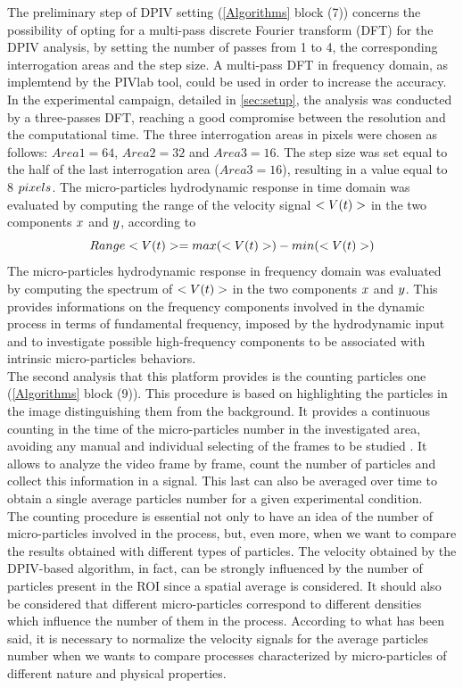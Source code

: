 \documentclass[journal]{IEEEtran}
\theoremstyle{definition}
\theoremstyle{remark}
\begin{document}
The preliminary step of DPIV setting (\fig\ref{Algorithms} block (7)) concerns the possibility of opting for a multi-pass discrete Fourier transform (DFT) for the DPIV analysis, by setting the number of passes from 1 to 4, the corresponding interrogation areas and the step size.
A multi-pass DFT in frequency domain, as implemtend by the PIVlab tool, could be used in order to increase the accuracy. In the experimental campaign, detailed in \sect\ref{sec:setup}, the analysis was conducted by a three-passes DFT, reaching a good compromise between the resolution and the computational time. The three interrogation areas in pixels were chosen as follows: $Area1=64$, $Area2=32$ and $Area3=16$. The step size was set equal to the half of the last interrogation area ($Area3=16$), resulting in a value equal to 8 $pixels$.
The micro-particles hydrodynamic response in time domain was evaluated by computing the range of the velocity signal $<V(t)>$ in the two components $x$ and $y$, according to 
\begin{equation}
	\label{eqn:range}
	Range\meann=max(\meann)-min(\meann)
\end{equation}
The micro-particles hydrodynamic response in frequency domain was evaluated by computing the spectrum of $<V(t)>$ in the two components $x$ and $y$. This provides informations on the frequency components involved in the dynamic process in terms of fundamental frequency, imposed by the hydrodynamic input and to investigate possible high-frequency components to be associated with intrinsic micro-particles behaviors.
\\The second analysis that this platform provides is the counting particles one (\fig\ref{Algorithms} block (9)). This procedure is based on highlighting the particles in the image distinguishing them from the background. It provides a continuous counting in the time of the micro-particles number in the investigated area, avoiding any manual and individual selecting of the frames to be studied . It allows to analyze the video frame by frame, count the number of particles and collect this information in a signal. This last can also be averaged over time to obtain a single average particles number for a given experimental condition.
\\The counting procedure is essential not only to have an idea of the number of micro-particles involved in the process, but, even more, when we want to compare the results obtained with different types of particles. The velocity obtained by the DPIV-based algorithm, in fact, can be strongly influenced by the number of particles present in the ROI since a spatial average is considered. It should also be considered that different micro-particles correspond to different densities which influence the number of them in the process. According to what has been said, it is necessary to normalize the velocity signals for the average particles number when we wants to compare processes characterized by micro-particles of different nature and physical properties.
\end{document}
